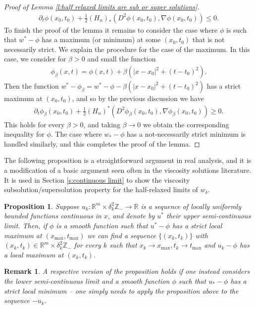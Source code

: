\documentclass[reqno]{amsart}
\newtheorem{proposition}[theorem]{Proposition}
\newtheorem{remark}[theorem]{Remark}
\numberwithin{equation}{section}
\begin{document}
\begin{proof}[Proof of Lemma \ref{l:half relaxed limits are sub or super solutions}]
\begin{align*}
    \partial_t\phi(x_0,t_0) + \tfrac{1}{2}(H_{n})_*(D^2\phi(x_0,t_0),\nabla \phi(x_0,t_0)) \leq 0.
  \end{align*}
  To finish the proof of the lemma it remains to consider the case where $\phi$ is such that $w^*-\phi$ has a maximum (or minimum) at some $(x_0,t_0)$ that is not necessarily strict. We explain the procedure for the case of the maximum. In this case, we consider for $\beta>0$ and small the function
  \begin{align*}
    \phi_\beta(x,t) = \phi(x,t) + \beta(|x-x_0|^2+(t-t_0)^2).    
  \end{align*}
  Then the function $w^*-\phi_\beta = w^*-\phi - \beta ( |x-x_0|^2+(t-t_0)^2)$ has a strict maximum at $(x_0,t_0)$, and so by the previous discussion we have
  \begin{align*}
    \partial_t\phi_\beta(x_0,t_0) + \tfrac{1}{2}(H_{n})^*(D^2\phi_\beta(x_0,t_0),\nabla \phi_\beta(x_0,t_0)) \geq 0.
  \end{align*}
  This holds for every $\beta>0$, and taking $\beta \to 0$ we obtain the corresponding inequality for $\phi$. The case where $w_*-\phi$ has a not-necessarily strict minimum is handled similarly, and this completes the proof of the lemma.
  
\end{proof}

The following proposition is a straightforward argument in real analysis, and it is a modification of a basic argument seen often in the viscosity solutions literature. It is used in Section \ref{s:continuous limit} to show the viscosity subsolution/supersolution property for the half-relaxed limits of $w_\delta$.
\begin{proposition}\label{p:stability of touching by test functions}
  Suppose $u_k:\mathbb{R}^m\times \delta_k^2 \mathbb{Z}_- \to \mathbb{R}$ is a sequence of locally uniformly bounded functions continuous in $x$, and denote by $u^*$ their upper semi-continuous limit. Then, if $\phi$ is a smooth function such that $u^*-\phi$ has a strict local maximum at $(x_{\max},t_{\max})$ we can find a sequence $\{(x_k,t_k)\}$ with $(x_k,t_k) \in \mathbb{R}^m\times \delta_k^2 \mathbb{Z}_-$ for every $k$  such that $x_k\to x_{\text{max}},t_k \to t_{\text{max}}$ and $u_k - \phi$ has a local maximum at $(x_{k},t_k)$. 
    
\end{proposition}

\begin{remark} A respective version of the proposition holds if one instead considers the lower semi-continuous limit and a smooth function $\phi$ such that $u_*-\phi$ has a strict local minimum -- one simply needs to apply the proposition above to the sequence $-u_k$. 
\end{remark}
\end{document}
